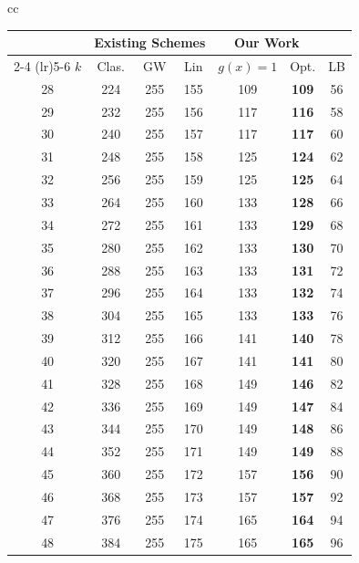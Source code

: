 \documentclass[onecolumn]{IEEEtran}
\theoremstyle{plain}
\theoremstyle{definition}
\begin{document}
\begin{table}[h!]
\begin{tabular}{cc}
        \begin{tabular}[t]{c c c c c c c}
            \toprule
             & \multicolumn{3}{c}{\textbf{Existing Schemes}} & \multicolumn{2}{c}{\textbf{Our Work}} & \\
            \cmidrule(lr){2-4} \cmidrule(lr){5-6}
            $k$ & Clas. & GW & Lin & $g(x)=1$ & Opt. & LB \\
            \midrule
            28 & 224 & 255 & 155 & 109 & \textbf{109} & 56 \\
            29 & 232 & 255 & 156 & 117 & \textbf{116} & 58 \\
            30 & 240 & 255 & 157 & 117 & \textbf{117} & 60 \\
            31 & 248 & 255 & 158 & 125 & \textbf{124} & 62 \\
            32 & 256 & 255 & 159 & 125 & \textbf{125} & 64 \\
            33 & 264 & 255 & 160 & 133 & \textbf{128} & 66 \\
            34 & 272 & 255 & 161 & 133 & \textbf{129} & 68 \\
            35 & 280 & 255 & 162 & 133 & \textbf{130} & 70 \\
            36 & 288 & 255 & 163 & 133 & \textbf{131} & 72 \\
            37 & 296 & 255 & 164 & 133 & \textbf{132} & 74 \\
            38 & 304 & 255 & 165 & 133 & \textbf{133} & 76 \\
            39 & 312 & 255 & 166 & 141 & \textbf{140} & 78 \\
            40 & 320 & 255 & 167 & 141 & \textbf{141} & 80 \\
            41 & 328 & 255 & 168 & 149 & \textbf{146} & 82 \\
            42 & 336 & 255 & 169 & 149 & \textbf{147} & 84 \\
            43 & 344 & 255 & 170 & 149 & \textbf{148} & 86 \\
            44 & 352 & 255 & 171 & 149 & \textbf{149} & 88 \\
            45 & 360 & 255 & 172 & 157 & \textbf{156} & 90 \\
            46 & 368 & 255 & 173 & 157 & \textbf{157} & 92 \\
            47 & 376 & 255 & 174 & 165 & \textbf{164} & 94 \\
            48 & 384 & 255 & 175 & 165 & \textbf{165} & 96 \\

\end{tabular}
\end{tabular}
\end{table}
\end{document}
